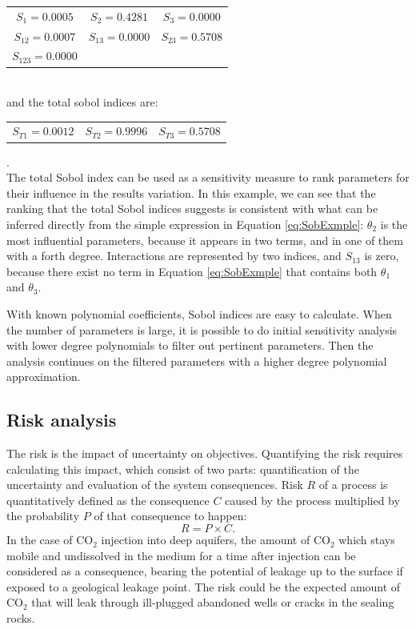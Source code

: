 \begin{tabular}{ccc}
$S_1=0.0005$ & $S_2=0.4281$ & $S_3=0.0000$ \\%
$S_{12}=0.0007$ &  $S_{13}=0.0000$ & $S_{23}=0.5708$\\ %
$S_{123}=0.0000$ & & %
\end{tabular}\\
and the total sobol indices are:\\
\begin{tabular}{ccc}
$S_{T1}= 0.0012$ & $S_{T2}= 0.9996$ & $S_{T3}= 0.5708$ 
\end{tabular}.\\ The total Sobol index can be used as a sensitivity
measure to rank parameters
for their influence in the results variation. In this example, we can see that
the ranking that the total Sobol indices suggests is consistent with what can
be inferred directly from the simple expression in Equation \ref{eq:SobExmple}:
$\theta_2$ is the most influential parameters, because it appears in two terms,
and in one of them with a forth degree. Interactions are represented by two
indices, and $S_{13}$ is zero, because there exist no term in Equation
\ref{eq:SobExmple} that contains both $\theta_1$ and $\theta_3$.

With known polynomial coefficients, Sobol indices are easy to calculate. When
the number of parameters is large, it is possible to do initial sensitivity
analysis with lower degree polynomials to filter out pertinent parameters. Then
the analysis continues on the filtered parameters with a higher
degree polynomial approximation.

\subsection{Risk analysis}
\label{Section:RA}

The risk is the impact of uncertainty on objectives. Quantifying the risk
requires calculating this impact, which consist of two parts: quantification of
the uncertainty and evaluation of the system consequences. Risk $R$ of a process
is quantitatively defined as the consequence $C$
caused by the process multiplied by the probability $P$ of that consequence to
happen:
%
\begin{equation}
R=P\times C
\label{eq:rsk}.\end{equation}
%
In the case of $\mbox{CO}_{2}$ injection into deep aquifers, the amount of
$\mbox{CO}_{2}$ which stays mobile and undissolved in the medium for a time
after injection can be considered as a consequence, bearing the potential of
leakage up to the surface if exposed to a geological leakage point. The risk
could be the expected amount of $\mbox{CO}_{2}$ that will leak through
ill-plugged abandoned wells or cracks in the sealing rocks. 


